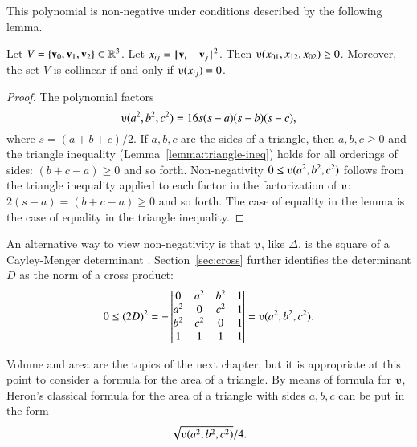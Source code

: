 This polynomial is non-negative under conditions described by the
following lemma. 


\begin{lemma}[]\label{lemma:ups} Let
  $V=\{{\mathbf v}_0,{\mathbf v}_1,{\mathbf v}_2\}\subset\mathbb{R}^3$.  Let $x_{ij} =
  \norm{\v_i}{\v_j}^2$.  Then $\ups(x_{01},x_{12},x_{02})\ge 0$.
  Moreover, the set $V$ is collinear if and only if $\ups(x_{ij}) =
  0$.%
\end{lemma}

\begin{proof}
The polynomial factors
\begin{equation}\label{eqn:ups}
\ups(a^2,b^2,c^2) = 16 s (s-a) (s-b)
  (s-c),
\end{equation}
where $s = (a+b+c)/2$.  If $a,b,c$ are the sides of a triangle, then
$a,b,c\ge0$ and the triangle inequality (Lemma~\ref{lemma:triangle-ineq})
holds for all orderings of sides: $(b+c-a)\ge 0$ and so forth.
Non-negativity $0\le \ups(a^2,b^2,c^2)$ follows from the triangle
inequality applied to each factor in the factorization of $\ups$:
$2(s-a) = (b+c-a) \ge0$ and so forth.  The case of equality in the lemma is the
case of equality in the triangle inequality.
%
%
\end{proof}

An alternative way to view non-negativity is
that $\ups$, like $\Delta$, is the square of a Cayley-Menger determinant
.  Section~\ref{sec:cross}  further identifies
the determinant $D$ as the norm of a cross product:
\[
0\le (2D)^2 = -
\left|\begin{matrix} 0 & a^2 & b^2 & 1\\ a^2 & 0 & c^2 & 1\\  b^2 & c^2 & 0 & 1\\
1 & 1 & 1& 1
\end{matrix}\right| = \ups(a^2,b^2,c^2).
\]


%
Volume and area are the topics of the next chapter, but it
is appropriate at this point to consider a formula for the area of a
triangle.  By means of formula  for $\ups$, Heron's classical formula
for the area of a triangle with sides $a,b,c$ can be put in the form
\begin{displaymath}\sqrt{\ups(a^2,b^2,c^2)}/4.\end{displaymath}

